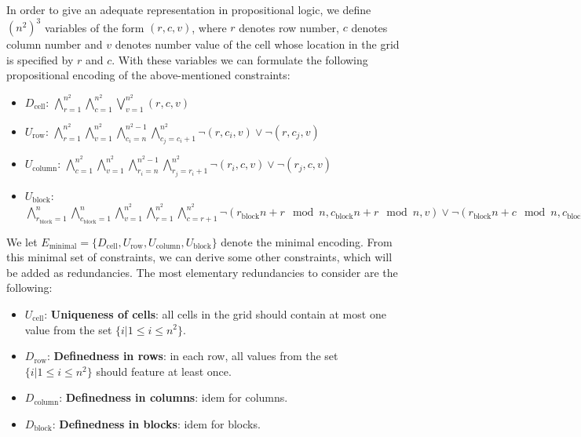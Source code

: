 \documentclass[10pt,a4paper,leqno]{article}
\newcommand{\dcell}{D_{\text{cell}}}
\newcommand{\urow}{U_{\text{row}}}
\newcommand{\ucol}{U_{\text{column}}}
\newcommand{\ublock}{U_{\text{block}}}
\newcommand{\ucell}{U_{\text{cell}}}
\newcommand{\drow}{D_{\text{row}}}
\newcommand{\dcol}{D_{\text{column}}}
\newcommand{\dblock}{D_{\text{block}}}
\begin{document}
In order to give an adequate representation in propositional logic, we define $(n^2)^3$ variables of the form $(r,c,v)$, where $r$ denotes row number, $c$ denotes column number and $v$ denotes number value of the cell whose location in the grid is specified by $r$ and $c$. With these variables we can formulate the following propositional encoding of the above-mentioned constraints:  

\begin{itemize}

\item $\dcell$: 
$\bigwedge_{r=1}^{n^2} \bigwedge_{c=1}^{n^2} \bigvee_{v=1}^{n^2} (r,c,v)$

\item $\urow$:
$\bigwedge_{r=1}^{n^2} \bigwedge_{v=1}^{n^2}\bigwedge_{c_i=n}^{n^2 - 1} \bigwedge_{c_j=c_i+1}^{n^2} \neg(r,c_i,v) \lor \neg(r,c_j,v)$


\item $\ucol$: 
$\bigwedge_{c=1}^{n^2} \bigwedge_{v=1}^{n^2}\bigwedge_{r_i=n}^{n^2-1} \bigwedge_{r_j=r_i+1}^{n^2} \neg(r_i,c,v) \lor \neg(r_j,c,v)$


\item $\ublock$:  
$\bigwedge_{r_{\text{block}} = 1}^{n} \bigwedge_{c_{\text{block}} = 1}^{n}\bigwedge_{v=1}^{n^2} \bigwedge_{r = 1}^{n^2} \bigwedge_{c = r + 1}^{n^2} \neg(r_{\text{block}} n + r \mod n,c_{\text{block}} n + r \mod n,v) \lor \neg(r_{\text{block}} n + c \mod n,c_{\text{block}} n + c \mod n,v)$

\end{itemize}

We let $E_{\text{minimal}} = \{\dcell,\urow,\ucol,\ublock\}$ denote the minimal encoding. From this minimal set of constraints, we can derive some other constraints, which will be added as redundancies. The most elementary redundancies to consider are the following: 


\begin{itemize}

\item $\ucell$: \textbf{Uniqueness of cells}: all cells in the grid should contain at most one value from the set $\{i | 1 \leq i \leq n^2\}$.

\item $\drow$: \textbf{Definedness in rows}: in each row, all values from the set $\{i | 1 \leq i \leq n^2\}$ should feature at least once. 

\item $\dcol$: \textbf{Definedness in columns}: idem for columns. 

\item $\dblock$: \textbf{Definedness in blocks}: idem for blocks. 

\end{itemize}
\end{document}
